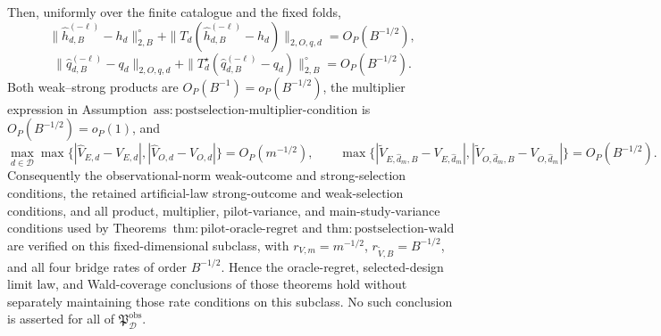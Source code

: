 Then, uniformly over the finite catalogue and the fixed folds,
\[
 \|\widehat h_{d,B}^{(-\ell)}-h_d\|_{2,B}^{\circ}
 +\|T_d(\widehat h_{d,B}^{(-\ell)}-h_d)\|_{2,O,q,d}
 =O_P(B^{-1/2}),                                               \tag{5}
\]
\[
 \|\widehat q_{d,B}^{(-\ell)}-q_d\|_{2,O,q,d}
 +\|T_d^\star(\widehat q_{d,B}^{(-\ell)}-q_d)\|_{2,B}^{\circ}
 =O_P(B^{-1/2}).                                               \tag{6}
\]
Both weak--strong products are \(O_P(B^{-1})=o_P(B^{-1/2})\), the multiplier expression in Assumption~\(\mathrm{ass{:}postselection\text{-}multiplier\text{-}condition}\) is \(O_P(B^{-1/2})=o_P(1)\), and
\[
 \max_{d\in\mathcal D}\max\bigl\{
 |\widehat V_{E,d}-V_{E,d}|,
 |\widehat V_{O,d}-V_{O,d}|\bigr\}=O_P(m^{-1/2}),
 \qquad
 \max\bigl\{
 |\widetilde V_{E,\widehat d_m,B}-V_{E,\widehat d_m}|,
 |\widetilde V_{O,\widehat d_m,B}-V_{O,\widehat d_m}|\bigr\}
 =O_P(B^{-1/2}).                                               \tag{7}
\]
Consequently the observational-norm weak-outcome and strong-selection conditions, the retained artificial-law strong-outcome and weak-selection conditions, and all product, multiplier, pilot-variance, and main-study-variance conditions used by Theorems~\(\mathrm{thm{:}pilot\text{-}oracle\text{-}regret}\) and \(\mathrm{thm{:}postselection\text{-}wald}\) are verified on this fixed-dimensional subclass, with \(r_{V,m}=m^{-1/2}\), \(r_{\widetilde V,B}=B^{-1/2}\), and all four bridge rates of order \(B^{-1/2}\).  Hence the oracle-regret, selected-design limit law, and Wald-coverage conclusions of those theorems hold without separately maintaining those rate conditions on this subclass.  No such conclusion is asserted for all of \(\mathfrak P_{\mathcal D}^{\mathrm{obs}}\).